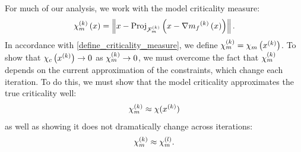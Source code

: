 
For much of our analysis, we work with the model criticality measure:
\begin{align*}
{\chi_m^{(k)}}\left(x\right) = \left\|x - {\textrm{Proj}}_{{\mathcal F_m^{(k)}}}\left(x- \nabla {{m}_f}^{(k)}\left(x\right)\right)\right\|.
\end{align*}
In accordance with \cref{define_criticality_measure}, we define ${\chi_m^{(k)}} = \chi_m\left(x^{(k)}\right)$.
To show that $\chi_c\left(x^{(k)}\right) \to 0$ as ${\chi_m^{(k)}} \to 0$, we must overcome the fact that
${\chi_m^{(k)}}$ depends on the current approximation of the constraints, which change each iteration.
To do this, we must show that the model criticality approximates the true criticality well:
\begin{align}
\label{verbiage_hoffman_use_one}
{\chi_m^{(k)}} \approx \chi (x^{(k)})
\end{align}
as well as showing it does not dramatically change across iterations:
\begin{align}
\label{verbiage_hoffman_use_two}
{\chi_m^{(k)}} \approx {\chi_m^{(l)}}.
\end{align}




